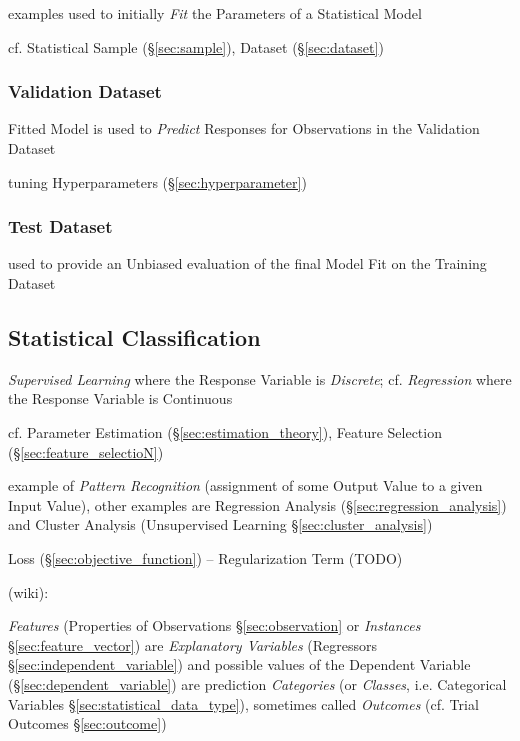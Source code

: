 examples used to initially \emph{Fit} the Parameters of a Statistical Model

cf. Statistical Sample (\S\ref{sec:sample}), Dataset (\S\ref{sec:dataset})



\subsubsection{Validation Dataset}\label{sec:validation_dataset}

Fitted Model is used to \emph{Predict} Responses for Observations in the
Validation Dataset

tuning Hyperparameters (\S\ref{sec:hyperparameter})



\subsubsection{Test Dataset}\label{sec:test_dataset}

used to provide an Unbiased evaluation of the final Model Fit on the Training
Dataset



\subsection{Statistical Classification}\label{sec:classification}

\emph{Supervised Learning} where the Response Variable is \emph{Discrete}; cf.
\emph{Regression} where the Response Variable is Continuous

cf. Parameter Estimation (\S\ref{sec:estimation_theory}), Feature Selection
(\S\ref{sec:feature_selectioN})

example of \emph{Pattern Recognition} (assignment of some Output Value to a
given Input Value), other examples are Regression Analysis
(\S\ref{sec:regression_analysis}) and Cluster Analysis (Unsupervised Learning
\S\ref{sec:cluster_analysis})

Loss (\S\ref{sec:objective_function}) -- Regularization Term (TODO)

(wiki):

\emph{Features} (Properties of Observations \S\ref{sec:observation} or
\emph{Instances} \S\ref{sec:feature_vector}) are \emph{Explanatory Variables}
(Regressors \S\ref{sec:independent_variable}) and possible values of the
Dependent Variable (\S\ref{sec:dependent_variable}) are prediction
\emph{Categories} (or \emph{Classes}, i.e. Categorical Variables
\S\ref{sec:statistical_data_type}), sometimes called \emph{Outcomes} (cf. Trial
Outcomes \S\ref{sec:outcome})


